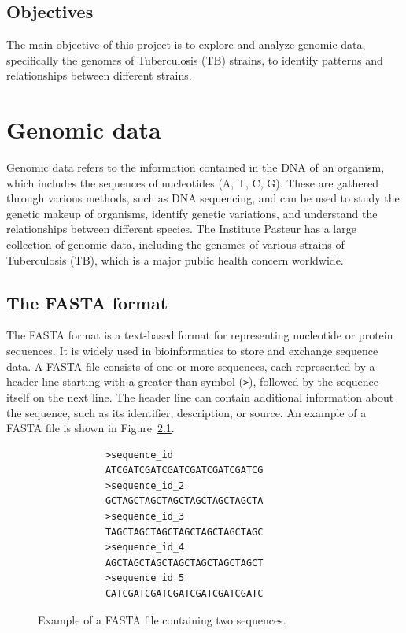 \section{Objectives}
\label{sec:objectives}

The main objective of this project is to explore and analyze genomic data, specifically the genomes of Tuberculosis (TB) strains, to
identify patterns and relationships between different strains.

\chapter{Genomic data}
\label{chap:genomic_data}

Genomic data refers to the information contained in the DNA of an organism, which includes the sequences of nucleotides (A, T, C, G).
These are gathered through various methods, such as DNA sequencing, and can be used to study the genetic makeup of organisms,
identify genetic variations, and understand the relationships between different species. The Institute Pasteur has a large collection
of genomic data, including the genomes of various strains of Tuberculosis (TB), which is a major public health concern worldwide.

\section{The FASTA format}
\label{sec:fasta_format}

The FASTA format is a text-based format for representing nucleotide or protein sequences. It is widely used in bioinformatics
to store and exchange sequence data. A FASTA file consists of one or more sequences, each represented by a header line starting with
a greater-than symbol (\texttt{>}), followed by the sequence itself on the next line. The header line can contain additional
information about the sequence, such as its identifier, description, or source. An example of a FASTA file is shown in
Figure~\ref{fig:fasta_example}.

\begin{center}
	\begin{figure}[H]
		\begin{BVerbatim}
			>sequence_id
			ATCGATCGATCGATCGATCGATCGATCG
			>sequence_id_2
			GCTAGCTAGCTAGCTAGCTAGCTAGCTA
			>sequence_id_3
			TAGCTAGCTAGCTAGCTAGCTAGCTAGC
			>sequence_id_4
			AGCTAGCTAGCTAGCTAGCTAGCTAGCT
			>sequence_id_5
			CATCGATCGATCGATCGATCGATCGATC
		\end{BVerbatim}
		\caption{Example of a FASTA file containing two sequences.}
		\label{fig:fasta_example}
	\end{figure}
\end{center}

